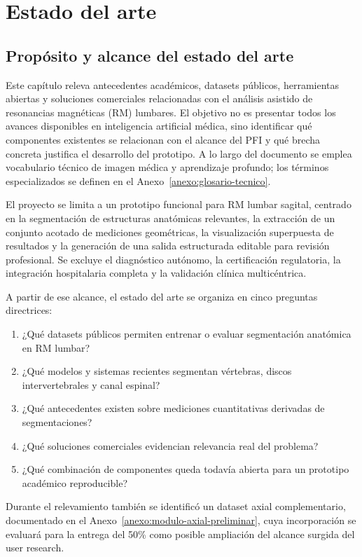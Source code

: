 \chapter{Estado del arte}

\section{Propósito y alcance del estado del arte}

Este capítulo releva antecedentes académicos, datasets públicos, herramientas abiertas y soluciones comerciales relacionadas con el análisis asistido de resonancias magnéticas (RM) lumbares. El objetivo no es presentar todos los avances disponibles en inteligencia artificial médica, sino identificar qué componentes existentes se relacionan con el alcance del PFI y qué brecha concreta justifica el desarrollo del prototipo. A lo largo del documento se emplea vocabulario técnico de imagen médica y aprendizaje profundo; los términos especializados se definen en el Anexo~\ref{anexo:glosario-tecnico}.

El proyecto se limita a un prototipo funcional para RM lumbar sagital, centrado en la segmentación de estructuras anatómicas relevantes, la extracción de un conjunto acotado de mediciones geométricas, la visualización superpuesta de resultados y la generación de una salida estructurada editable para revisión profesional. Se excluye el diagnóstico autónomo, la certificación regulatoria, la integración hospitalaria completa y la validación clínica multicéntrica.

A partir de ese alcance, el estado del arte se organiza en cinco preguntas directrices:

\begin{enumerate}
    \item ¿Qué datasets públicos permiten entrenar o evaluar segmentación anatómica en RM lumbar?
    \item ¿Qué modelos y sistemas recientes segmentan vértebras, discos intervertebrales y canal espinal?
    \item ¿Qué antecedentes existen sobre mediciones cuantitativas derivadas de segmentaciones?
    \item ¿Qué soluciones comerciales evidencian relevancia real del problema?
    \item ¿Qué combinación de componentes queda todavía abierta para un prototipo académico reproducible?
\end{enumerate}

Durante el relevamiento también se identificó un dataset axial complementario, documentado en el Anexo~\ref{anexo:modulo-axial-preliminar}, cuya incorporación se evaluará para la entrega del 50\% como posible ampliación del alcance surgida del user research.

